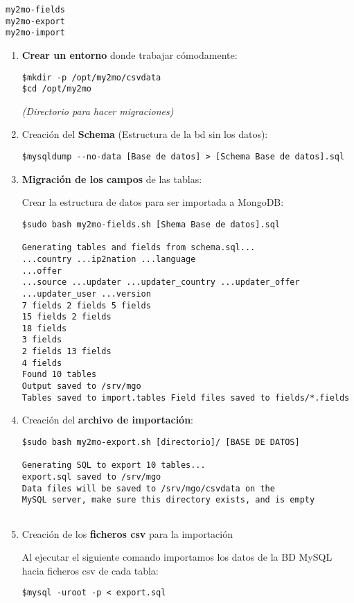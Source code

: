 \documentclass[12pt,a4paper]{article}
\begin{document}
\begin{verbatim}
my2mo-fields
my2mo-export
my2mo-import
\end{verbatim}


\begin{enumerate}
\item \textbf{Crear un entorno} donde trabajar cómodamente: 
\begin{verbatim}
$mkdir -p /opt/my2mo/csvdata 
$cd /opt/my2mo
\end{verbatim}
\textit{(Directorio para hacer migraciones)}

\item Creación del \textbf{Schema} (Estructura de la bd sin los datos): 
\begin{verbatim}
$mysqldump --no-data [Base de datos] > [Schema Base de datos].sql
\end{verbatim}

\item \textbf{Migración de los campos} de las tablas:

Crear la estructura de datos para ser importada a MongoDB: 
\begin{verbatim}
$sudo bash my2mo-fields.sh [Shema Base de datos].sql

Generating tables and fields from schema.sql...
...country ...ip2nation ...language
...offer
...source ...updater ...updater_country ...updater_offer ...updater_user ...version
7 fields 2 fields 5 fields
15 fields 2 fields
18 fields
3 fields
2 fields 13 fields
4 fields
Found 10 tables
Output saved to /srv/mgo
Tables saved to import.tables Field files saved to fields/*.fields
\end{verbatim}

\item Creación del \textbf{archivo de importación}:

\begin{verbatim}
$sudo bash my2mo-export.sh [directorio]/ [BASE DE DATOS]

Generating SQL to export 10 tables...
export.sql saved to /srv/mgo
Data files will be saved to /srv/mgo/csvdata on the
MySQL server, make sure this directory exists, and is empty
 
\end{verbatim}

\item Creación de los \textbf{ficheros csv} para la importación

Al ejecutar el siguiente comando importamos los datos de la BD MySQL hacia ficheros csv de cada tabla: 
\begin{verbatim} 
$mysql -uroot -p < export.sql
\end{verbatim}


\end{enumerate}
\end{document}
